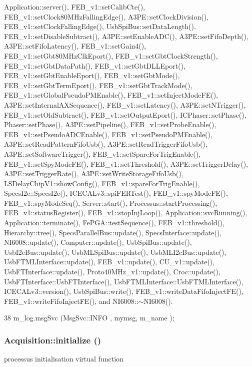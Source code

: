 Application::server(), FEB\_\-v1::setCalibCte(), FEB\_\-v1::setClock80MHzFallingEdge(), A3PE::setClockDivision(), FEB\_\-v1::setClockFallingEdge(), UsbSpiBus::setDataLength(), FEB\_\-v1::setDisableSubtract(), A3PE::setEnableADC(), A3PE::setFifoDepth(), A3PE::setFifoLatency(), FEB\_\-v1::setGain4(), FEB\_\-v1::setGbt80MHzClkEport(), FEB\_\-v1::setGbtClockStrength(), FEB\_\-v1::setGbtDataPath(), FEB\_\-v1::setGbtDLLEport(), FEB\_\-v1::setGbtEnableEport(), FEB\_\-v1::setGbtMode(), FEB\_\-v1::setGbtTermEport(), FEB\_\-v1::setGbtTrackMode(), FEB\_\-v1::setGlobalPseudoPMEnable(), FEB\_\-v1::setInjectModeFE(), A3PE::setInternalAXSequence(), FEB\_\-v1::setLatency(), A3PE::setNTrigger(), FEB\_\-v1::setOldSubtract(), FEB\_\-v1::setOutputEport(), ICPhaser::setPhase(), Phaser::setPhase(), A3PE::setPipeline(), FEB\_\-v1::setProbeEnable(), FEB\_\-v1::setPseudoADCEnable(), FEB\_\-v1::setPseudoPMEnable(), A3PE::setReadPatternFifoUsb(), A3PE::setReadTriggerFifoUsb(), A3PE::setSoftwareTrigger(), FEB\_\-v1::setSpareForTrigEnable(), FEB\_\-v1::setSpyModeFE(), FEB\_\-v1::setThreshold(), A3PE::setTriggerDelay(), A3PE::setTriggerRate(), A3PE::setWriteStorageFifoUsb(), LSDelayChipV1::showConfig(), FEB\_\-v1::spareForTrigEnable(), SpecsI2c::SpecsI2c(), ICECALv3::spiFERTest(), FEB\_\-v1::spyModeFE(), FEB\_\-v1::spyModeSeq(), Server::start(), Processus::startProcessing(), FEB\_\-v1::statusRegister(), FEB\_\-v1::stopInjLoop(), Application::svcRunning(), Application::terminate(), FePGA::testSequence(), FEB\_\-v1::threshold(), Hierarchy::tree(), SpecsParallelBus::update(), SpecsInterface::update(), NI6008::update(), Computer::update(), UsbSpiBus::update(), UsbI2cBus::update(), UsbMLSpiBus::update(), UsbMLI2cBus::update(), UsbFTMLInterface::update(), FEB\_\-v1::update(), CU\_\-v1::update(), UsbFTInterface::update(), Proto40MHz\_\-v1::update(), Croc::update(), UsbFTInterface::UsbFTInterface(), UsbFTMLInterface::UsbFTMLInterface(), ICECALv3::version(), UsbSpiBus::write(), FEB\_\-v1::writeDataFifoInjectFE(), FEB\_\-v1::writeFifoInjectFE(), and NI6008::$\sim$NI6008().


\begin{DoxyCode}
38 { m_log.msgSvc (MsgSvc::INFO    , mymsg, m_name ); }
\end{DoxyCode}
\hypertarget{classAcquisition_acffc6b70b80811657409f92e489584ba}{
\subsubsection[{initialize}]{ Acquisition::initialize ()}}
\label{classAcquisition_acffc6b70b80811657409f92e489584ba}
processus initialisation virtual function 

